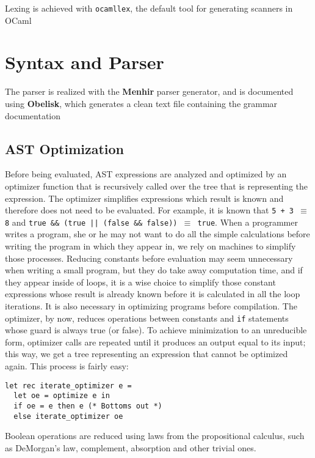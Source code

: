 \documentclass[a4paper, 11pt]{article}
\theoremstyle{plain}%
\theoremstyle{definition}
\theoremstyle{remark}
\begin{document}
Lexing is achieved with \texttt{ocamllex}, the default tool for generating
scanners in OCaml

\section{Syntax and Parser}
The parser is realized with the \textbf{Menhir} parser generator, and is
documented using \textbf{Obelisk}, which generates a clean text file
containing the grammar documentation



\begin{multicols}{2}

\section{AST Optimization}
Before being evaluated, AST expressions are analyzed and optimized by an
optimizer function that is recursively called over the tree that is representing
the expression. The optimizer simplifies expressions which result is known and
therefore does not need to be evaluated. For example, it is known that \texttt{5
+ 3 $\equiv$ 8} and \texttt{true \&\& (true || (false \&\& false)) $\equiv$
true}. When a programmer writes a program, she or he may not want to do all the
simple calculations before writing the program in which they appear in, we rely
on machines to simplify those processes. Reducing constants before evaluation
may seem unnecessary when writing a small program, but they do take away
computation time, and if they appear inside of loops, it is a wise choice to
simplify those constant expressions whose result is already known before it is
calculated in all the loop iterations. It is also necessary in optimizing
programs before compilation. The optimizer, by now, reduces operations between
constants and \texttt{if} statements whose guard is always true (or false). To
achieve minimization to an unreducible form, optimizer calls are repeated until
it produces an output equal to its input; this way, we get a tree representing
an expression that cannot be optimized again. This process is fairly easy:

\begin{lstlisting}[style=caml]
let rec iterate_optimizer e =
  let oe = optimize e in
  if oe = e then e (* Bottoms out *)
  else iterate_optimizer oe
\end{lstlisting}

Boolean operations are reduced using laws from the propositional calculus, such as DeMorgan's law, complement, absorption and other trivial ones.


\end{multicols}
\end{document}
